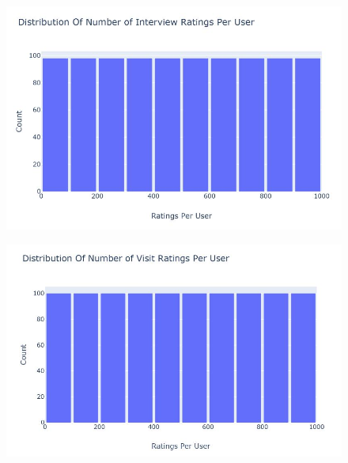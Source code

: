 \documentclass{aifyp}
\begin{document}
\begin{appendices}
\begin{figure}[H]
    \includegraphics[scale=0.5]{Images/Chapter6/DistributionofRatingsPerUserInt.JPG}
    \label{fig:DistIntRatingPerUserBarchart}
\end{figure}
\begin{figure}[H]
    \centering
    \includegraphics[scale=0.5]{Images/Chapter6/DistributionofRatingsPerUserVisit.JPG}
    \label{fig:DistVisitRatingPerUserBarchart}
\end{figure}

\newpage

\end{appendices}
\end{document}
